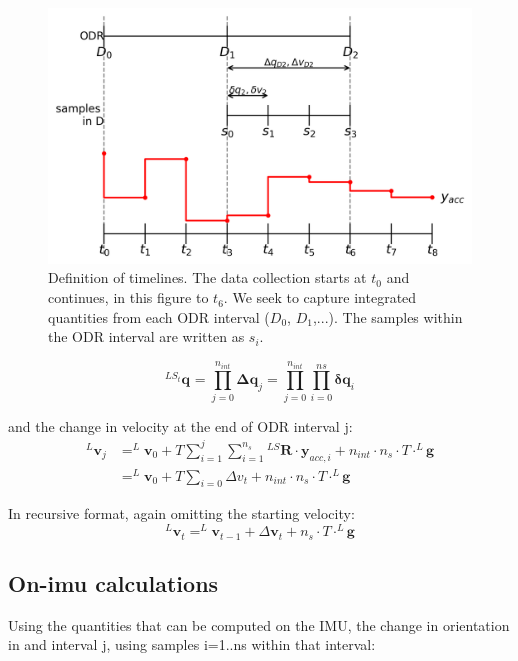 \documentclass{article}
\begin{document}
\begin{figure}[ht]
\includegraphics[scale=.8]{strapdown_integration_timelines.png} 
\caption{Definition of timelines. The data collection starts at $t_0$ and continues, in this figure to $t_6$. We seek to capture integrated quantities from each ODR interval ($D_0$, $D_1$,...). The samples within the ODR interval are written as $s_i$.}
\centering
\end{figure}

\begin{equation} \label{eq:orientation_chopped_up}
^{LS_t}\textbf{q}_{} = \prod_{j=0}^{n_{int}}\boldsymbol{\Delta q}_j
= \prod_{j=0}^{n_{int}} \prod_{i=0}^{ns} \boldsymbol{\delta q}_i
\end{equation}

and the change in velocity at the end of ODR interval j:
\begin{equation} \label{eq:acceleration_chopped_up}
\begin{aligned}
^L\textbf{v}_{j} &= ^L\textbf{v}_0 + T \sum_{i=1}^{j} \sum_{i=1}^{n_s} {}^{LS}\boldsymbol{R} \cdot \boldsymbol{y}_{acc,i} +n_{int} \cdot n_s \cdot T \cdot ^L\boldsymbol{g} \\ 
&=  ^L\textbf{v}_0 + T \sum_{i=0}^{} \Delta v_t + n_{int} \cdot n_s \cdot T \cdot ^L\boldsymbol{g}
\end{aligned}
\end{equation}

In recursive format, again omitting the starting velocity:
\begin{equation}
^L\textbf{v}_t = ^L\textbf{v}_{t-1} + \Delta \textbf{v}_t +  n_s \cdot T \cdot ^L\boldsymbol{g}
\end{equation}

\subsection{On-imu calculations}
Using the quantities that can be computed on the IMU, the change in orientation in and interval j, using samples i=1..ns within that interval:
\end{document}
